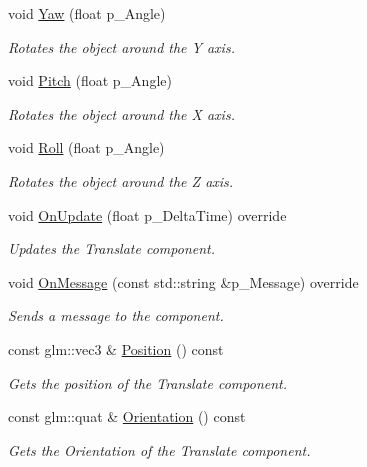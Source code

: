 \begin{DoxyCompactItemize}
void \mbox{\hyperlink{class_transform_component_accd65ad684a25f6b97132d5479dc906f}{Yaw}} (float p\+\_\+\+Angle)
\begin{DoxyCompactList}\small\item\em Rotates the object around the Y axis. \end{DoxyCompactList}\item 
void \mbox{\hyperlink{class_transform_component_a4c090d0fa38ebead21ec208fbb26d5c5}{Pitch}} (float p\+\_\+\+Angle)
\begin{DoxyCompactList}\small\item\em Rotates the object around the X axis. \end{DoxyCompactList}\item 
void \mbox{\hyperlink{class_transform_component_ace336994b66a5dd69c33f86edbe578ad}{Roll}} (float p\+\_\+\+Angle)
\begin{DoxyCompactList}\small\item\em Rotates the object around the Z axis. \end{DoxyCompactList}\item 
void \mbox{\hyperlink{class_transform_component_a4e84c8415bc74787d8392182de9c15df}{On\+Update}} (float p\+\_\+\+Delta\+Time) override
\begin{DoxyCompactList}\small\item\em Updates the Translate component. \end{DoxyCompactList}\item 
void \mbox{\hyperlink{class_transform_component_a07510e9014663febd69f9c00666a3951}{On\+Message}} (const std\+::string \&p\+\_\+\+Message) override
\begin{DoxyCompactList}\small\item\em Sends a message to the component. \end{DoxyCompactList}\item 
const glm\+::vec3 \& \mbox{\hyperlink{class_transform_component_afa045f69a5721b753fdcfb9abb465e32}{Position}} () const
\begin{DoxyCompactList}\small\item\em Gets the position of the Translate component. \end{DoxyCompactList}\item 
const glm\+::quat \& \mbox{\hyperlink{class_transform_component_aae8fd949d2ecb08fc12fd0bdee8c2ddc}{Orientation}} () const
\begin{DoxyCompactList}\small\item\em Gets the Orientation of the Translate component. \end{DoxyCompactList}\item 

\end{DoxyCompactItemize}
